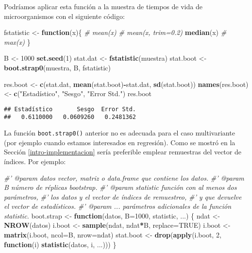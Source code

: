 \documentclass[
]{book}
\newenvironment{Shaded}{\begin{snugshade}}{\end{snugshade}}
\newcommand{\CommentTok}[1]{\textcolor[rgb]{0.56,0.35,0.01}{\textit{#1}}}
\newcommand{\ControlFlowTok}[1]{\textcolor[rgb]{0.13,0.29,0.53}{\textbf{#1}}}
\newcommand{\DataTypeTok}[1]{\textcolor[rgb]{0.13,0.29,0.53}{#1}}
\newcommand{\DecValTok}[1]{\textcolor[rgb]{0.00,0.00,0.81}{#1}}
\newcommand{\KeywordTok}[1]{\textcolor[rgb]{0.13,0.29,0.53}{\textbf{#1}}}
\newcommand{\NormalTok}[1]{#1}
\newcommand{\OperatorTok}[1]{\textcolor[rgb]{0.81,0.36,0.00}{\textbf{#1}}}
\newcommand{\OtherTok}[1]{\textcolor[rgb]{0.56,0.35,0.01}{#1}}
\newcommand{\StringTok}[1]{\textcolor[rgb]{0.31,0.60,0.02}{#1}}
\theoremstyle{break}
\theoremstyle{definition}
\theoremstyle{definition}
\theoremstyle{definition}
\theoremstyle{remark}
\begin{document}
Podríamos aplicar esta función a la muestra de tiempos de vida de
microorganismos con el siguiente código:

\begin{Shaded}
\begin{Highlighting}[]
\NormalTok{fstatistic <-}\StringTok{ }\ControlFlowTok{function}\NormalTok{(x)\{}
  \CommentTok{#  mean(x)}
  \CommentTok{#  mean(x, trim=0.2)}
  \KeywordTok{median}\NormalTok{(x)}
  \CommentTok{#  max(x)}
\NormalTok{\}}

\NormalTok{B <-}\StringTok{ }\DecValTok{1000}
\KeywordTok{set.seed}\NormalTok{(}\DecValTok{1}\NormalTok{)}
\NormalTok{stat.dat <-}\StringTok{ }\KeywordTok{fstatistic}\NormalTok{(muestra)}
\NormalTok{stat.boot <-}\StringTok{ }\KeywordTok{boot.strap0}\NormalTok{(muestra, B, fstatistic)}

\NormalTok{res.boot <-}\StringTok{ }\KeywordTok{c}\NormalTok{(stat.dat, }\KeywordTok{mean}\NormalTok{(stat.boot)}\OperatorTok{-}\NormalTok{stat.dat, }\KeywordTok{sd}\NormalTok{(stat.boot))}
\KeywordTok{names}\NormalTok{(res.boot) <-}\StringTok{ }\KeywordTok{c}\NormalTok{(}\StringTok{"Estadístico"}\NormalTok{, }\StringTok{"Sesgo"}\NormalTok{, }\StringTok{"Error Std."}\NormalTok{)}
\NormalTok{res.boot}
\end{Highlighting}
\end{Shaded}

\begin{verbatim}
## Estadístico       Sesgo  Error Std. 
##   0.6110000   0.0609260   0.2481362
\end{verbatim}

La función \texttt{boot.strap0()} anterior no es adecuada para el caso multivariante
(por ejemplo cuando estamos interesados en regresión).
Como se mostró en la Sección \ref{intro-implementacion}
sería preferible emplear remuestras del vector de índices. Por ejemplo:

\begin{Shaded}
\begin{Highlighting}[]
\CommentTok{#' @param datos vector, matriz o data.frame que contiene los datos.}
\CommentTok{#' @param B número de réplicas bootstrap.}
\CommentTok{#' @param statistic función con al menos dos parámetros, }
\CommentTok{#' los datos y el vector de índices de remuestreo, }
\CommentTok{#' y que devuelve el vector de estadísticos.}
\CommentTok{#' @param ... parámetros adicionales de la función statistic.}
\NormalTok{boot.strap <-}\StringTok{ }\ControlFlowTok{function}\NormalTok{(datos, }\DataTypeTok{B=}\DecValTok{1000}\NormalTok{, statistic, ...) \{}
\NormalTok{  ndat <-}\StringTok{ }\KeywordTok{NROW}\NormalTok{(datos)}
\NormalTok{  i.boot <-}\StringTok{ }\KeywordTok{sample}\NormalTok{(ndat, ndat}\OperatorTok{*}\NormalTok{B, }\DataTypeTok{replace=}\OtherTok{TRUE}\NormalTok{)}
\NormalTok{  i.boot <-}\StringTok{ }\KeywordTok{matrix}\NormalTok{(i.boot, }\DataTypeTok{ncol=}\NormalTok{B, }\DataTypeTok{nrow=}\NormalTok{ndat)}
\NormalTok{  stat.boot <-}\StringTok{ }\KeywordTok{drop}\NormalTok{(}\KeywordTok{apply}\NormalTok{(i.boot, }\DecValTok{2}\NormalTok{, }\ControlFlowTok{function}\NormalTok{(i) }\KeywordTok{statistic}\NormalTok{(datos, i, ...)))}
\NormalTok{\}}
\end{Highlighting}
\end{Shaded}
\end{document}
